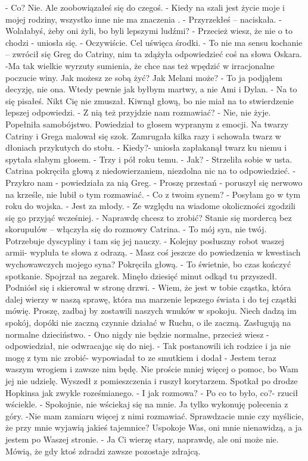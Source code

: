 \documentclass[12pt,a4paper]{book}
\begin{document}
- Co? Nie. Ale zoobowiązałeś się do czegoś. 
- Kiedy na szali jest życie moje i mojej rodziny, wszystko inne nie ma znaczenia .
- Przyrzekłeś – naciskała. 
- Wolałabyś, żeby oni żyli, bo byli lepszymi ludźmi?
- Przecież wiesz, że nie o to chodzi - uniosła się. 
- Oczywiście. Cel uświęca środki. 
- To nie ma sensu kochanie – zwrócił się Greg do Catriny, nim ta zdążyła odpowiedzieć coś na słowa Oskara.  -Ma tak wielkie wyrzuty sumienia, że chce nas też wpędzić w irracjonalne poczucie winy. Jak możesz ze sobą żyć? Jak Melani może?
- To ja podjąłem decyzję, nie ona. Wtedy pewnie jak byłbym martwy, a nie Ami i Dylan.
- Na to się pisałeś. Nikt Cię nie zmuszał. 
Kiwnął głową, bo nie miał na to stwierdzenie lepszej odpowiedzi. 
- Z nią też przyjdzie nam rozmawiać?
- Nie, nie żyje. Popełniła samobójstwo. 
Powiedział to głosem wypranym z emocji. Na twarzy Catriny i Grega malował się szok. Zamrugała kilka razy i schowała twarz w dłoniach przykutych do stołu. 
- Kiedy?- uniosła zapłakanął twarz ku niemu i spytała słabym głosem.
- Trzy i pół roku temu. 
- Jak?
- Strzeliła sobie w usta. 
Catrina pokręciła głową z niedowierzaniem, niezdolna nic na to odpowiedzieć.
- Przykro nam - powiedziała za nią Greg.
- Proszę przestań - poruszył się nerwowo na krześle, nie lubił o tym rozmawiać. 
- Co z twoim synem? 
- Posyłam go w tym roku do wojska.
- Jest za młody. 
- Ze względu na wiadome okoliczności zgodzili się go przyjąć wcześniej. 
-  Naprawdę chcesz to zrobić? Stanie się mordercą bez skorupułów – włączyła się do rozmowy Catrina.
- To mój syn, nie twój. Potrzebuje dyscypliny i tam się jej nauczy. 
- Kolejny posłuszny robot waszej armii- wypluła te słowa z odrazą. 
- Masz coś jeszcze do powiedzenia w kwestiach wychowawczych mojego syna?
Pokręciła głową. 
- To świetnie, bo czas kończyć spotkanie. 
Spojrzał na zegarek. Minęło dziesięć minut odkąd tu przyszedł.  Podniósł się i skierował w stronę drzwi. 
- Wiem, że jest w tobie cząstka, która dalej wierzy w naszą sprawę, która ma marzenie lepszego świata i do tej cząstki mówię. Proszę, zadbaj by zostawili naszych wnuków w spokoju. Niech dadzą im spokój, dopóki nie zaczną czynnie działać w Ruchu, o ile zaczną. Zasługują na normalne dzieciństwo. 
- Ono nigdy nie będzie normalne, przecież wiesz - odpowiedział, nie odwracając się do niej. - Tak postanowili ich rodzice i ja nie mogę z tym nic zrobić- wypowiadał to ze smutkiem i dodał - Jestem teraz waszym wrogiem i zawsze nim będę. Nie proście mniej więcej o pomoc, bo Wam jej nie udzielę. 
Wyszedł z pomieszczenia i ruszył korytarzem. Spotkał po drodze Hopkinsa jak zwykle roześmianego.
- I jak rozmowa?
- Po co to było, co?- rzucił wściekle. 
- Spokojnie, nie wściekaj się na mnie. Ja tylko wykonuję polecenia z góry. 
-Nie mam zamiaru więcej z nimi rozmawiać. Sprawdzacie mnie czy myślicie, że przy mnie wyjawią jakieś tajemnice? Uspokoje Was, oni mnie nienawidzą, a ja jestem po Waszej  stronie.
- Ja Ci wierzę stary, naprawdę, ale oni może nie. Mówią, że gdy ktoś zdradzi zawsze pozostaje zdrajcą.
 
\end{document}
